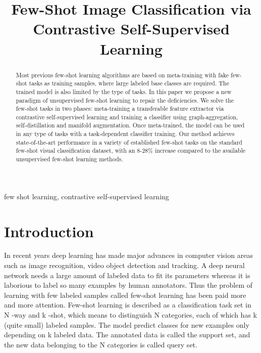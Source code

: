 \documentclass[conference]{IEEEtran}
\begin{document}
\title{Few-Shot Image Classification via Contrastive Self-Supervised Learning\\
}

\author{
\and
{}
}

\maketitle

\begin{abstract}
Most previous few-shot learning algorithms are based on meta-training with fake few-shot tasks as training samples, where large labeled base classes are required. The trained model is also limited by the type of tasks. In this paper we propose a new paradigm of unsupervised few-shot learning to repair the deficiencies. We solve the few-shot tasks in two phases: meta-training a transferable feature extractor via contrastive self-supervised learning and training a classifier using graph-aggregation, self-distillation and manifold augmentation. Once meta-trained, the model can be used in any type of tasks with a task-dependent classifier training. Our method achieves state-of-the-art performance in a variety of established few-shot tasks on the standard few-shot visual classiﬁcation dataset, with an 8-28\% increase compared to the available unsupervised few-shot learning methods.
\end{abstract}

\begin{IEEEkeywords}
few shot learning, contrastive self-supervised learning
\end{IEEEkeywords}

\section{Introduction}
In recent years deep learning has made major advances in computer vision areas such as image recognition, video object detection and tracking. A deep neural network needs a large amount of labeled data to fit its parameters whereas it is laborious to label so many examples by human annotators. Thus the problem of learning with few labeled samples called few-shot learning has been paid more and more attention. Few-shot learning is described as a classification task set in N -way and k -shot, which means to distinguish N categories, each of which has k (quite small) labeled samples. The model predict classes for new examples only depending on k labeled data. The annotated data is called the support set, and the new data belonging to the N categories is called query set.
\end{document}

